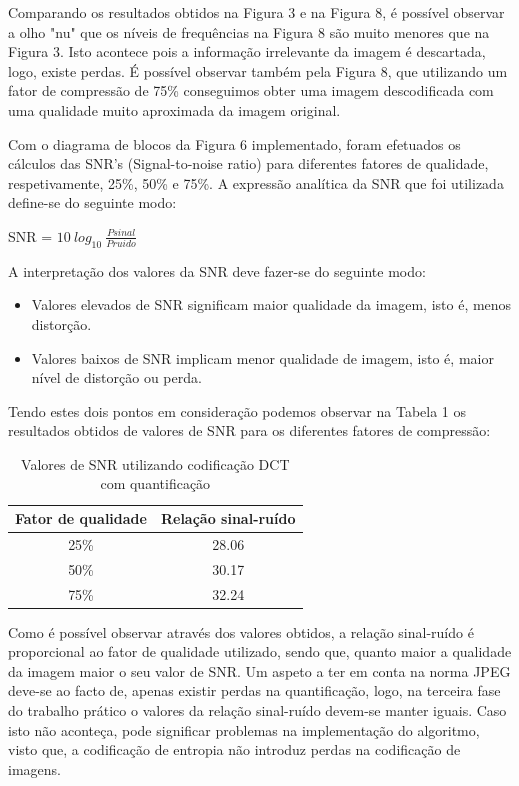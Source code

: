\documentclass[12pt,a4paper]{article}
\begin{document}
Comparando os resultados obtidos na Figura 3 e na Figura 8, é possível observar a olho "nu" que os níveis de frequências na Figura 8 são muito menores que na Figura 3. Isto acontece pois a informação irrelevante da imagem é descartada, logo, existe perdas. É possível observar também pela Figura 8, que utilizando um fator de compressão de 75\% conseguimos obter uma imagem descodificada com uma qualidade muito aproximada da imagem original.

Com o diagrama de blocos da Figura 6 implementado, foram efetuados os cálculos  das SNR's (Signal-to-noise ratio) para diferentes fatores de qualidade, respetivamente, 25\%, 50\% e 75\%. A expressão analítica da SNR que foi utilizada define-se do seguinte modo:
\begin{center}
SNR = $10\: log_{10}\: \frac{Psinal}{Pruido}$
\end{center}
A interpretação dos valores da SNR deve fazer-se do seguinte modo:

\begin{itemize}
\item Valores elevados de SNR significam maior qualidade da imagem, isto é, menos distorção.
\item Valores baixos de SNR implicam menor qualidade de imagem, isto é, maior nível de distorção ou perda.
\end{itemize}

Tendo estes dois pontos em consideração podemos observar na Tabela 1 os resultados obtidos de valores de SNR para os diferentes fatores de compressão:

\begin{table}[h]
\centering
\label{my-label}
\begin{tabular}{|c|c|}
\hline
\textbf{Fator de qualidade} & \textbf{Relação sinal-ruído} \\ \hline
25\%                         & 28.06                          \\ \hline
50\%                         & 30.17                          \\ \hline
75\%                         & 32.24                          \\ \hline
\end{tabular}
\caption{Valores de SNR utilizando codificação DCT com quantificação}
\end{table}

Como é possível observar através dos valores obtidos, a relação sinal-ruído é proporcional ao fator de qualidade utilizado, sendo que, quanto maior a qualidade da imagem maior o seu valor de SNR. Um aspeto a ter em conta na norma JPEG deve-se ao facto de, apenas existir perdas na quantificação, logo, na terceira fase do trabalho prático o valores da relação sinal-ruído devem-se manter iguais. Caso isto não aconteça, pode significar problemas na implementação do algoritmo, visto que, a codificação de entropia não introduz perdas na codificação de imagens.
\end{document}
